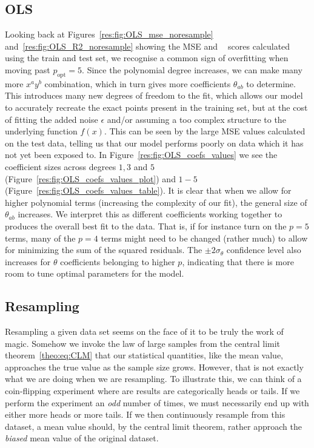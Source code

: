 \documentclass[twocolumn,english,notitlepage]{article}
\DeclareMathOperator{\Rsquared}{R^2}
\newcommand{\msub}[2]{\ensuremath{{#1}_\text{#2}}}
\begin{document}
    \subsection{OLS}
        Looking back at Figures~\ref{res:fig:OLS_mse_noresample} and~\ref{res:fig:OLS_R2_noresample} showing the MSE and $\Rsquared$ scores calculated using the train and test set, we recognise a common sign of overfitting when moving past $\msub{p}{opt} = 5$. Since the polynomial degree increases, we can make many more $x^ay^b$ combination, which in turn gives more coefficients $\theta_{ab}$ to determine. This introduces many new degrees of freedom to the fit, which allows our model to accurately recreate the exact points present in the training set, but at the cost of fitting the added noise $\epsilon$ and/or assuming a too complex structure to the underlying function $f(x)$. This can be seen by the large MSE values calculated on the test data, telling us that our model performs poorly on data which it has not yet been exposed to. In Figure~\ref{res:fig:OLS_coefs_values} we see the coefficient sizes across degrees $1,3$ and $5$ (Figure~\ref{res:fig:OLS_coefs_values_plot}) and $1-5$ (Figure~\ref{res:fig:OLS_coefs_values_table}). It is clear that when we allow for higher polynomial terms (increasing the complexity of our fit), the general size of $\theta_{ab}$ increases. We interpret this as different coefficients working together to produces the overall best fit to the data. That is, if for instance turn on the $p=5$ terms, many of the $p=4$ terms might need to be changed (rather much) to allow for minimizing the sum of the squared residuals. The $\pm 2\sigma_{\theta}$ confidence level also increases for $\theta$ coefficients belonging to higher $p$, indicating that there is more room to tune optimal parameters for the model.       

    \subsection{Resampling}
        Resampling a given data set seems on the face of it to be truly the work of magic. Somehow we invoke the law of large samples from the central limit theorem~\eqref{theo:eq:CLM} that our statistical quantities, like the mean value, approaches the true value as the sample size grows. However, that is not exactly what we are doing when we are resampling. To illustrate this, we can think of a coin-flipping experiment where are results are categorically heads or tails. If we perform the experiment an \textit{odd} number of times, we must necessarily end up with either more heads or more tails. If we then continuously resample from this dataset, a mean value should, by the central limit theorem, rather approach the \textit{biased} mean value of the original dataset.
\end{document}
